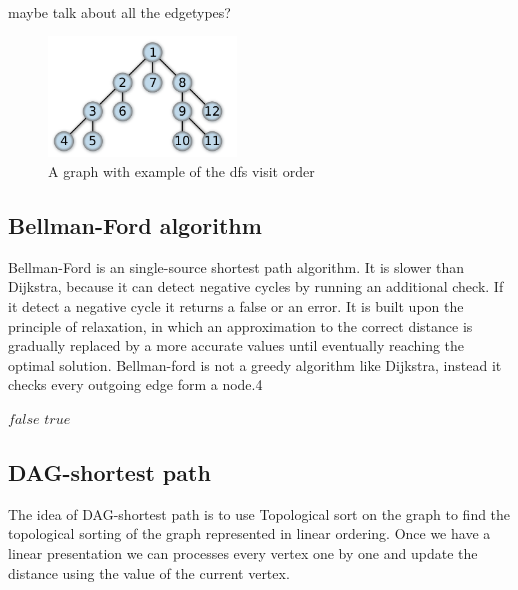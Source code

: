 \documentclass[a4paper, 10pt]{article}
\begin{document}
\begin{algorithmic}
\\ maybe talk about all the edgetypes?
\begin{figure}[hbt]
    \begin{center}
        \includegraphics[width=5cm] {img/dfs.png}
	\caption{A graph with example of the dfs visit order}
    \end{center}
\end{figure}

\subsection{Bellman-Ford algorithm}
Bellman-Ford is an single-source shortest path algorithm. It is slower than Dijkstra, because it can detect negative cycles by running an additional check. If it detect a negative cycle it returns a false or an error. It is built upon the principle of relaxation, in which an approximation to the correct distance is gradually replaced by a more accurate values until eventually reaching the optimal solution. Bellman-ford is not a greedy algorithm like Dijkstra, instead it checks every outgoing edge form a node.4
\\

\begin{algoritmic}
\State {}
                \State {}
        \EndFor
\EndFor
{}
                \State \Return $false$
        \EndIf
\EndFor
\State \Return $true$
\EndFunction

\end{algoritmic}

\subsection{DAG-shortest path}
The idea of DAG-shortest path is to use Topological sort on the graph to find the topological sorting of the graph represented in linear ordering. Once we have a linear presentation we can processes every vertex one by one and update the distance using the value of the current vertex.
\\


\end{algorithmic}
\end{document}
